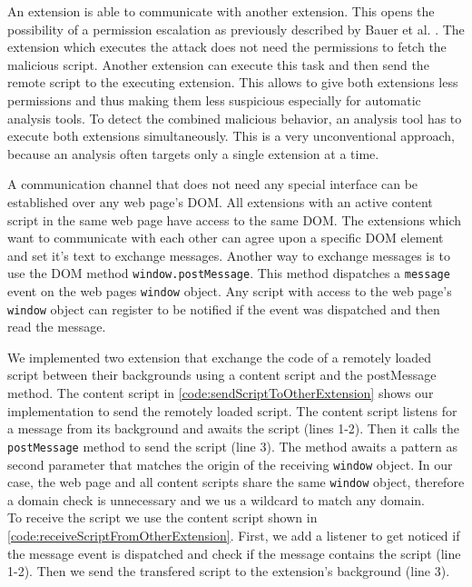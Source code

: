 	An extension is able to communicate with another extension. This opens the possibility of a permission escalation as previously described by Bauer et al. \cite{extensions:cns14}. The extension which executes the attack does not need the permissions to fetch the malicious script. Another extension can execute this task and then send the remote script to the executing extension. This allows to give both extensions less permissions and thus making them less suspicious especially for automatic analysis tools. To detect the combined malicious behavior, an analysis tool has to execute both extensions simultaneously. This is a very unconventional approach, because an analysis often targets only a single extension at a time. 
	
	A communication channel that does not need any special interface can be established over any web page's DOM. All extensions with an active content script in the same web page have access to the same DOM. The extensions which want to communicate with each other can agree upon a specific DOM element and set it's text to exchange messages. Another way to exchange messages is to use the DOM method \texttt{window.postMessage}. This method dispatches a \texttt{message} event on the web pages \texttt{window} object. Any script with access to the web page's \texttt{window} object can register to be notified if the event was dispatched and then read the message. 
	
	We implemented two extension that exchange the code of a remotely loaded script between their backgrounds using a content script and the postMessage method. The content script in \autoref{code:sendScriptToOtherExtension} shows our implementation to send the remotely loaded script. The content script listens for a message from its background and awaits the script (lines 1-2). Then it calls the \texttt{postMessage} method to send the script (line 3). The method awaits a pattern as second parameter that matches the origin of the receiving \texttt{window} object. In our case, the web page and all content scripts share the same \texttt{window} object, therefore a domain check is unnecessary and we us a wildcard to match any domain. \\
	To receive the script we use the content script shown in \autoref{code:receiveScriptFromOtherExtension}. First, we add a listener to get noticed if the message event is dispatched and check if the message contains the script (line 1-2). Then we send the transfered script to the extension's background (line 3). 
	
